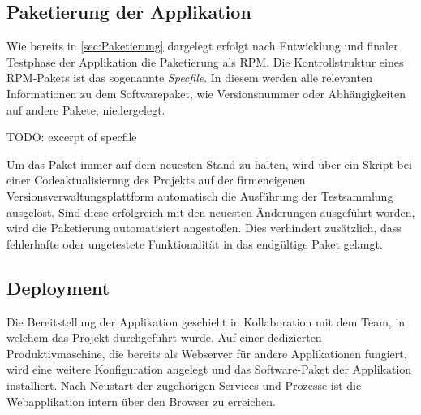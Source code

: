 \subsection{Paketierung der Applikation}
\label{sec:Paketierung der Applikation}
Wie bereits in \ref{sec:Paketierung} dargelegt erfolgt nach Entwicklung und finaler Testphase der
Applikation die Paketierung als RPM. Die Kontrollstruktur eines RPM-Pakets ist das sogenannte
\textit{Specfile}. In diesem werden alle relevanten Informationen zu dem Softwarepaket,
wie \bspw Versionsnummer oder Abhängigkeiten auf andere Pakete, niedergelegt.

TODO: excerpt of specfile

Um das Paket immer auf dem neuesten Stand zu halten, wird über ein Skript bei einer
Codeaktualisierung des Projekts auf der firmeneigenen Versionsverwaltungsplattform automatisch die
Ausführung der Testsammlung ausgelöst. Sind diese erfolgreich mit den neuesten Änderungen ausgeführt
worden, wird die Paketierung automatisiert angestoßen. Dies verhindert zusätzlich, dass fehlerhafte
oder ungetestete Funktionalität in das endgültige Paket gelangt.

\subsection{Deployment}
\label{sec:Deployment}
Die Bereitstellung der Applikation geschieht in Kollaboration mit dem Team, in welchem das
Projekt durchgeführt wurde. Auf einer dedizierten Produktivmaschine, die bereits als Webserver für
andere Applikationen fungiert, wird eine weitere Konfiguration angelegt und das Software-Paket der
Applikation installiert. Nach Neustart der zugehörigen Services und Prozesse ist die
Webapplikation intern über den Browser zu erreichen.
